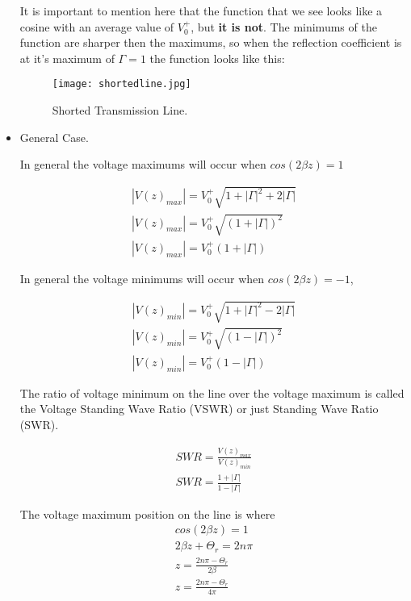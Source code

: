 \documentclass{ximera}
\begin{document}
\begin{itemize}
It is important to mention here that the function that we see looks
like a cosine with an average value of $ V_0^+ $, but {\bf it is not}.
The minimums of the function are sharper then the maximums, so when
the reflection coefficient is at it's maximum of $\Gamma =1$ the
function looks like this:


\begin{figure}[htbp]
\begin{center}
\texttt{[image: shortedline.jpg]}
\end{center}
\caption{Shorted Transmission Line.}
\label{wind}
\end{figure}



\item General Case. 

In general the voltage maximums will occur when
$cos(2 \beta z)=1$

\begin{eqnarray}
|V(z)_{max}|=V_0^+\sqrt{1+|\Gamma|^2+2 |\Gamma|} \nonumber  \\
|V(z)_{max}| =V_0^+\sqrt{(1+|\Gamma|)^2}  \nonumber \\
|V(z)_{max}| =V_0^+(1+|\Gamma|) 
\end{eqnarray}



In general the voltage minimums will occur when
$cos(2 \beta z)=-1$,



\begin{eqnarray}
|V(z)_{min}|=V_0^+\sqrt{1+|\Gamma|^2-2 |\Gamma|} \nonumber  \\
|V(z)_{min}| =V_0^+\sqrt{(1-|\Gamma|)^2}  \nonumber \\
|V(z)_{min}| =V_0^+ (1-|\Gamma|) 
\end{eqnarray}

The ratio of voltage minimum on the line over the voltage maximum is
called the Voltage Standing Wave Ratio (VSWR) or just Standing Wave
Ratio (SWR).

\begin{eqnarray}
SWR=\frac{V(z)_{max}}{ V(z)_{min}} \nonumber \\
SWR=\frac{1+|\Gamma|}{1-|\Gamma|}
\end{eqnarray}

The voltage maximum position on the line is where
\begin{eqnarray}
cos(2 \beta z)=1 \nonumber \\
2 \beta z + \Theta_r = 2 n \pi \nonumber \\
z =\frac{ 2 n \pi -\Theta_r }{ 2 \beta} \nonumber \\
z=\frac{ 2 n \pi -\Theta_r }{ 4 \pi}
\end{eqnarray}



\end{itemize}
\end{document}
